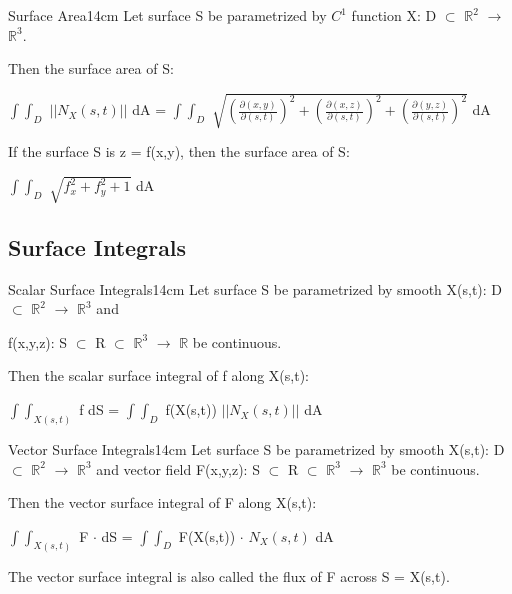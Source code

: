     \begin{wtheorem}{Surface Area}{14cm}
        Let surface S be parametrized by $C^1$ function X:
        D $\subset$ $\mathbb{R}^2$ $\rightarrow$ $\mathbb{R}^3$.
        
        Then the surface area of S:

        \hspace{0.5cm}
        $\int \int_D$ $|| N_X(s,t) ||$ dA
        = $\int \int_D$ $\sqrt{(\frac{\partial(x,y)}{\partial(s,t)})^2
                                + (\frac{\partial(x,z)}{\partial(s,t)})^2
                                + (\frac{\partial(y,z)}{\partial(s,t)})^2}$ dA

        If the surface S is z = f(x,y), then the surface area of S:

        \hspace{0.5cm}
        $\int \int_D$ $\sqrt{f_x^2 + f_y^2 + 1}$ dA
    \end{wtheorem}

    \vspace{0.5cm}





\subsection{ Surface Integrals }

    \begin{wtheorem}{Scalar Surface Integrals}{14cm}
        Let surface S be parametrized by smooth X(s,t):
        D $\subset$ $\mathbb{R}^2$ $\rightarrow$ $\mathbb{R}^3$ and
        
        f(x,y,z): S $\subset$ R $\subset$ $\mathbb{R}^3$
        $\rightarrow$ $\mathbb{R}$ be continuous.

        Then the {\color{lblue} scalar surface integral} of f along X(s,t):

        \hspace{0.5cm}
        $\int \int_{X(s,t)}$ f dS
        = $\int \int_D$ f(X(s,t)) $||N_X(s,t)||$ dA
    \end{wtheorem}

    \vspace{0.5cm}



    \begin{wtheorem}{Vector Surface Integrals}{14cm}
        Let surface S be parametrized by smooth X(s,t):
        D $\subset$ $\mathbb{R}^2$ $\rightarrow$ $\mathbb{R}^3$ and
        vector field F(x,y,z): S $\subset$ R $\subset$ $\mathbb{R}^3$
        $\rightarrow$ $\mathbb{R}^3$ be continuous.

        Then the {\color{lblue} vector surface integral} of F along X(s,t):

        \hspace{0.5cm}
        $\int \int_{X(s,t)}$ F $\cdot$ dS
        = $\int \int_D$ F(X(s,t)) $\cdot$ $N_X(s,t)$ dA
        
        The vector surface integral is also called the
        {\color{lblue} flux of F across S = X(s,t)}.
    \end{wtheorem}

